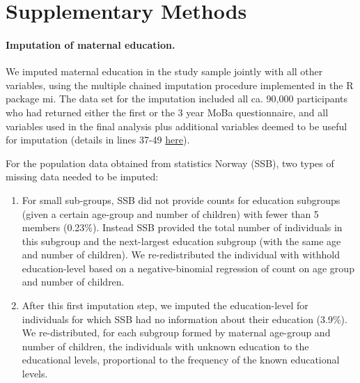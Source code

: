 \documentclass[12pt]{article}
\begin{document}
\section{Supplementary Methods}

\paragraph{Imputation of maternal education.} We imputed maternal education in the study sample jointly with all other variables, using the multiple chained imputation procedure implemented in the R package mi. The data set for the imputation included all ca. 90,000 participants who had returned  either the first or the 3 year MoBa questionnaire, and all variables used in the final analysis plus additional variables deemed to be useful for imputation (details in lines 37-49 \href{https://github.com/gbiele/IPW/blob/master/AnalysisBIPW/021\_mi\_utils.R}{here}).

For the population data obtained from statistics Norway (SSB), two types of missing data needed to be imputed: 
\begin{enumerate}
	\item For small sub-groups, SSB did not provide counts for education subgroups (given a certain age-group and number of children) with fewer than 5 members (0.23\%). Instead SSB provided the total number of individuals in this subgroup and the next-largest education subgroup (with the same age and number of children). We re-redistributed the individual with withhold education-level based on a negative-binomial regression of count on age group and number of children.
	\item After this first imputation step, we imputed the education-level for individuals for which SSB had no information about their education (3.9\%). We re-distributed, for each subgroup formed by maternal age-group and number of children, the individuals with unknown education to the educational levels, proportional to the frequency of the known educational levels. 
\end{enumerate}
\end{document}
